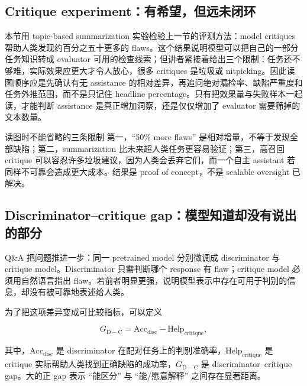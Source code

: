 \subsection{Critique experiment：有希望，但远未闭环}

本节用 topic-based summarization 实验检验上一节的评测方法：model critiques 帮助人类发现约百分之五十更多的 flaws。这个结果说明模型可以把自己的一部分任务知识转成 evaluator 可用的检查线索；但讲者紧接着给出三个限制：任务还不够难，实际效果应更大才令人放心，很多 critiques 是垃圾或 nitpicking。因此读图顺序应是先确认有无 assistance 的相对差异，再追问绝对漏检率、缺陷严重度和任务外推范围，而不是只记住 headline percentage。只有把效果量与失败样本一起读，才能判断 assistance 是真正增加洞察，还是仅仅增加了 evaluator 需要筛掉的文本数量。


\begin{warningbox}{读图时不能省略的三条限制}
第一，``50\% more flaws'' 是相对增量，不等于发现全部缺陷；第二，summarization 比未来超人类任务更容易验证；第三，高召回 critique 可以容忍许多垃圾建议，因为人类会丢弃它们，而一个自主 assistant 若同样不可靠会造成更大成本。结果是 proof of concept，不是 scalable oversight 已解决。
\end{warningbox}


\subsection{Discriminator--critique gap：模型知道却没有说出的部分}

Q\&A 把问题推进一步：同一 pretrained model 分别微调成 discriminator 与 critique model。Discriminator 只需判断哪个 response 有 flaw；critique model 必须用自然语言指出 flaw。若前者明显更强，说明模型表示中存在可用于判别的信息，却没有被可靠地表述给人类。

为了把这项差异变成可比较指标，可以定义

\[
G_{\mathrm{D-C}}=\mathrm{Acc}_{\mathrm{disc}}-\mathrm{Help}_{\mathrm{critique}},
\]

其中，$\mathrm{Acc}_{\mathrm{disc}}$ 是 discriminator 在配对任务上的判别准确率，$\mathrm{Help}_{\mathrm{critique}}$ 是 critique 实际帮助人类找到正确缺陷的成功率，$G_{\mathrm{D-C}}$ 是 discriminator--critique gap。大的正 gap 表示 ``能区分'' 与 ``能/愿意解释'' 之间存在显著距离。

